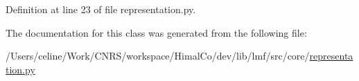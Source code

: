 Definition at line 23 of file representation.\+py.



The documentation for this class was generated from the following file\+:\begin{DoxyCompactItemize}
\item 
/\+Users/celine/\+Work/\+C\+N\+R\+S/workspace/\+Himal\+Co/dev/lib/lmf/src/core/\hyperlink{representation_8py}{representation.\+py}\end{DoxyCompactItemize}
